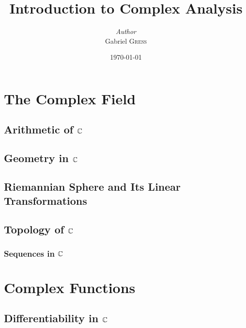 \documentclass[oneside]{memoir}
\institute{Rice University}
\title{Introduction to Complex Analysis}
\author{\textit{Author}\\Gabriel \textsc{Gress}}
\date{\today}
\begin{document}
\maketitle

\tableofcontents

\chapter{The Complex Field}
\label{cha:the_complex_field}

\section{Arithmetic of \(\mathbb{C}\)}
\label{sec:arithmetic_and_geometry_of_c}



\section{Geometry in \(\mathbb{C}\)}
\label{sec:geometry_in_c}



\section{Riemannian Sphere and Its Linear Transformations}
\label{sec:riemannian_sphere_and_its_linear_transformations}



\section{Topology of \(\mathbb{C}\)}
\label{sec:topology_of_c}



\subsection{Sequences in \(\mathbb{C}\)}
\label{sub:sequences_in_c}



\chapter{Complex Functions}
\label{cha:complex_functions}



\section{Differentiability in \(\mathbb{C}\)}
\label{sec:differentiability_in_c}
\end{document}
